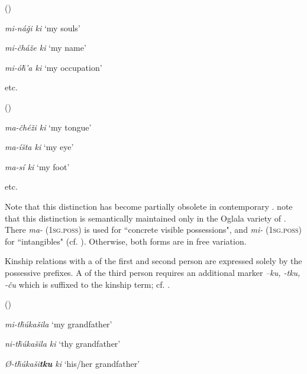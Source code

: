 \documentclass[output=paper]{LSP/langsci}
\begin{document}
\ea {} (\citealt[101]{Buechel1939}) \label{lakotaincorporeal}

\textit{mi-ná\v{g}i ki } \hspace{2.1em}		`my souls'

\textit{mi-\v{c}há\v{z}e  ki } \hspace{1.9em} `my name'

\textit{mi-ó\v{h}'a ki}	\hspace{2em}		`my occupation'

etc.

\ex {} (\citealt[100]{Buechel1939}) \label{lakotabody}

\textit{ma-\v{c}hé\v{z}i ki } \hspace{1.7em}	`my tongue'

\textit{ma-íšta ki }	 \hspace{2.1em}	`my eye'

\textit{ma-sí ki }		 \hspace{3em}	`my foot'

etc.
\z

Note that this distinction has become partially obsolete in contemporary . \citet[458]{RoodTaylor1996} note that this distinction is semantically maintained only in the Oglala variety of . There \textit{ma-} (\textsc{1sg.poss}) is used for ``concrete visible possessions", and \textit{mi-} (\textsc{1sg.poss}) for ``intangibles" (cf. \citealt[458]{RoodTaylor1996}). Otherwise, both forms are in free variation.

Kinship relations with a  of the first and second person are expressed solely by the possessive prefixes. A  of the third person requires an additional marker \textit{–ku, -tku, -\v{c}u} which is suffixed to the  kinship term; cf. .

\ea	{} (\citealt[102]{Buechel1939}) \label{lakotamygrandfather}

\textit{mi-t\v{h}\'ukašila} \hspace{3.6em}		`my grandfather'
 
\textit{ni-t\v{h}\'ukašila ki } \hspace{2.3em}	`thy grandfather'

\textit{Ø-t\v{h}\'ukaši\textbf{tku} ki }	\hspace{1.8em} `his/her grandfather'
\z
\end{document}
